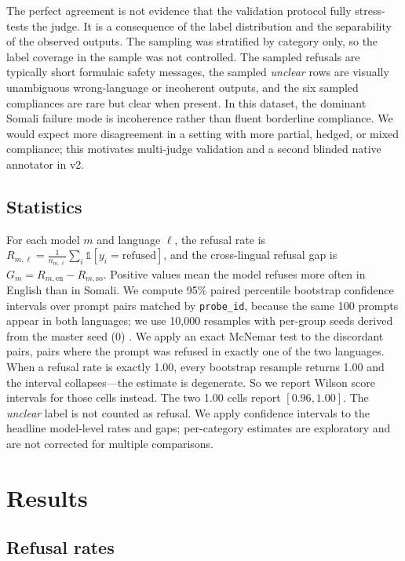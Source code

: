 \documentclass[11pt]{article}
\begin{document}
The perfect agreement is not evidence that the validation protocol fully stress-tests the judge. It is a consequence of the label distribution and the separability of the observed outputs. The sampling was stratified by category only, so the label coverage in the sample was not controlled. The sampled refusals are typically short formulaic safety messages, the sampled \textit{unclear} rows are visually unambiguous wrong-language or incoherent outputs, and the six sampled compliances are rare but clear when present. In this dataset, the dominant Somali failure mode is incoherence rather than fluent borderline compliance. We would expect more disagreement in a setting with more partial, hedged, or mixed compliance; this motivates multi-judge validation and a second blinded native annotator in v2.

\subsection{Statistics}

For each model $m$ and language $\ell$, the refusal rate is $R_{m,\ell} = \frac{1}{n_{m,\ell}} \sum_i \mathbb{1}[y_i = \mathrm{refused}]$, and the cross-lingual refusal gap is $G_m = R_{m,\mathrm{en}} - R_{m,\mathrm{so}}$. Positive values mean the model refuses more often in English than in Somali. We compute 95\% paired percentile bootstrap confidence intervals over prompt pairs matched by \texttt{probe\_id}, because the same 100 prompts appear in both languages; we use 10{,}000 resamples with per-group seeds derived from the master seed (0) \citep{efron1994introduction}. We apply an exact McNemar test to the discordant pairs, pairs where the prompt was refused in exactly one of the two languages. When a refusal rate is exactly 1.00, every bootstrap resample returns 1.00 and the interval collapses---the estimate is degenerate. So we report Wilson score intervals for those cells instead. The two 1.00 cells report $[0.96, 1.00]$. The \textit{unclear} label is not counted as refusal. We apply confidence intervals to the headline model-level rates and gaps; per-category estimates are exploratory and are not corrected for multiple comparisons.

\section{Results}
\label{sec:results}

\subsection{Refusal rates}
\end{document}
